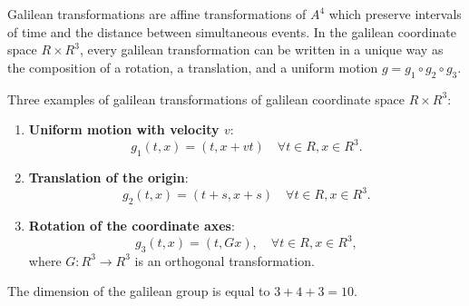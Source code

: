 Galilean transformations are affine transformations of $A^4$ which preserve intervals of time and the distance between simultaneous events. In the galilean coordinate space $R \times R^3$, every galilean transformation can be written in a unique way as the composition of a rotation, a translation, and a uniform motion $g = g_1 \circ g_2 \circ g_3$.

Three examples of galilean transformations of galilean coordinate space $R \times R^3$:

\begin{enumerate}
\item \textbf{Uniform motion with velocity $v$}:
$$g_1(t, x) = (t, x + vt) \quad \forall t \in R, x \in R^3.$$

\item \textbf{Translation of the origin}:
$$g_2(t, x) = (t + s, x + s) \quad \forall t \in R, x \in R^3.$$

\item \textbf{Rotation of the coordinate axes}:
$$g_3(t, x) = (t, Gx), \quad \forall t \in R, x \in R^3,$$
where $G: R^3 \rightarrow R^3$ is an orthogonal transformation.
\end{enumerate}

The dimension of the galilean group is equal to $3 + 4 + 3 = 10$.

